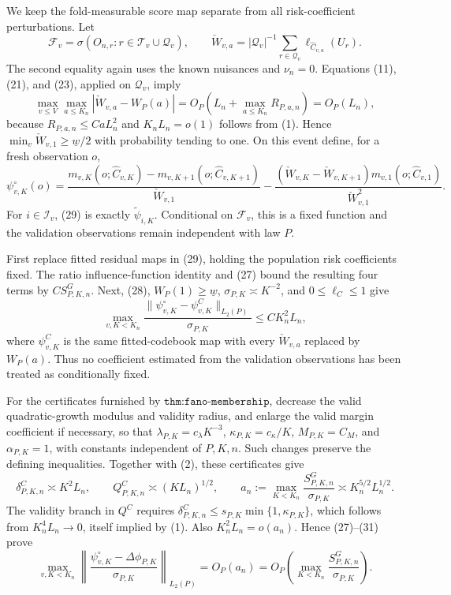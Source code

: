 We keep the fold-measurable score map separate from all risk-coefficient perturbations.  Let
\[
 \mathcal F_v=\sigma(O_{n,r}:r\in\mathcal T_v\cup\mathcal Q_v),
 \qquad
 \check W_{v,a}=|\mathcal Q_v|^{-1}\sum_{r\in\mathcal Q_v}
 \ell_{\widehat C_{v,a}}(U_r).
\]
The second equality again uses the known nuisances and \(\nu_n=0\).  Equations (11), (21), and (23), applied on \(\mathcal Q_v\), imply
\[
 \max_{v\leq V}\max_{a\leq K_n}|\check W_{v,a}-W_P(a)|
 =O_P\!\left(L_n+\max_{a\leq K_n}R_{P,a,n}\right)=O_P(L_n),                 \tag{28}
\]
because \(R_{P,a,n}\leq CaL_n^2\) and \(K_nL_n=o(1)\) follows from (1).  Hence \(\min_v\check W_{v,1}\geq\underline w/2\) with probability tending to one.  On this event define, for a fresh observation \(o\),
\[
 \psi_{v,K}^{\circ}(o)=
 \frac{m_{v,K}(o;\widehat C_{v,K})-m_{v,K+1}(o;\widehat C_{v,K+1})}{\check W_{v,1}}
 -\frac{(\check W_{v,K}-\check W_{v,K+1})m_{v,1}(o;\widehat C_{v,1})}
 {\check W_{v,1}^2}.                                                         \tag{29}
\]
For \(i\in\mathcal I_v\), (29) is exactly \(\widetilde\psi_{i,K}\).  Conditional on \(\mathcal F_v\), this is a fixed function and the validation observations remain independent with law \(P\).

First replace fitted residual maps in (29), holding the population risk coefficients fixed.  The ratio influence-function identity and (27) bound the resulting four terms by \(CS^G_{P,K,n}\).  Next, (28), \(W_P(1)\geq\underline w\), \(\sigma_{P,K}\asymp K^{-2}\), and \(0\leq\ell_C\leq1\) give
\[
 \max_{v,K<K_n}\frac{\|\psi_{v,K}^{\circ}-\psi_{v,K}^{C}\|_{L_2(P)}}{\sigma_{P,K}}
 \leq CK_n^2L_n,                                                            \tag{30}
\]
where \(\psi_{v,K}^{C}\) is the same fitted-codebook map with every \(\check W_{v,a}\) replaced by \(W_P(a)\).  Thus no coefficient estimated from the validation observations has been treated as conditionally fixed.

For the certificates furnished by \(\texttt{thm:fano-membership}\), decrease the valid quadratic-growth modulus and validity radius, and enlarge the valid margin coefficient if necessary, so that \(\lambda_{P,K}=c_\lambda K^{-3}\), \(\kappa_{P,K}=c_\kappa/K\), \(M_{P,K}=C_M\), and \(\alpha_{P,K}=1\), with constants independent of \(P,K,n\).  Such changes preserve the defining inequalities.  Together with (2), these certificates give
\[
 \delta^C_{P,K,n}\asymp K^2L_n,\qquad
 Q^C_{P,K,n}\asymp(KL_n)^{1/2},\qquad
 a_n:=\max_{K<K_n}\frac{S^G_{P,K,n}}{\sigma_{P,K}}\asymp K_n^{5/2}L_n^{1/2}. \tag{31}
\]
The validity branch in \(Q^C\) requires \(\delta^C_{P,K,n}\leq s_{P,K}\min\{1,\kappa_{P,K}\}\), which follows from \(K_n^4L_n\to0\), itself implied by (1).  Also \(K_n^2L_n=o(a_n)\).  Hence (27)--(31) prove
\[
 \max_{v,K<K_n}\left\|
 \frac{\psi_{v,K}^{\circ}-\Delta\phi_{P,K}}{\sigma_{P,K}}
 \right\|_{L_2(P)}=O_P(a_n)
 =O_P\!\left(\max_{K<K_n}\frac{S^G_{P,K,n}}{\sigma_{P,K}}\right).          \tag{32}
\]

